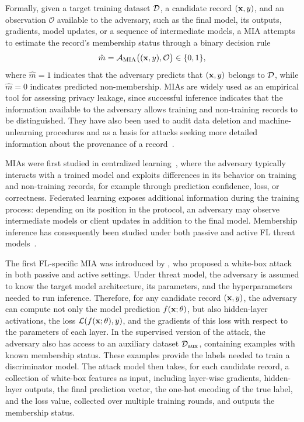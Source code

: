 Formally, given a target training dataset $\mathcal{D}$, a candidate record $({\mathbf{x}},y)$, and an observation $\mathcal{O}$ available to the adversary, such as the final model, its outputs, gradients, model updates, or a sequence of intermediate models, a MIA attempts to estimate the record's membership status through a binary decision rule
\begin{equation}
\hat{m}
=
\mathcal{A}_{\mathrm{MIA}}\big(({\mathbf{x}},y),\mathcal{O}\big)
\in \{0,1\},
\end{equation}
where $\hat{m}=1$ indicates that the adversary predicts that $({\mathbf{x}},y)$ belongs to $\mathcal{D}$, while $\hat{m}=0$ indicates predicted non-membership.
MIAs are widely used as an empirical tool for assessing privacy leakage, since successful inference indicates that the information available to the adversary allows training and non-training records to be distinguished. They have also been used to audit data deletion and machine-unlearning procedures and as a basis for attacks seeking more detailed information about the provenance of a record~\cite{xiao_mia,hu2021sourceinferenceattacksfederated}.

MIAs were first studied in centralized learning~\cite{shokri2017membershipinferenceattacksmachine,yeom2018privacyriskmachinelearning,carlini2022membershipinferenceattacksprinciples}, where the adversary typically interacts with a trained model and exploits differences in its behavior on training and non-training records, for example through prediction confidence, loss, or correctness. Federated learning exposes additional information during the training process: depending on its position in the protocol, an adversary may observe intermediate models or client updates in addition to the final model. Membership inference has consequently been studied under both passive and active FL threat models~\cite{mia_survey_bai}.

The first FL-specific MIA was introduced by , who proposed a white-box attack in both passive and active settings. Under threat model, the adversary is assumed to know the target model architecture, its parameters, and the hyperparameters needed to run inference. Therefore, for any candidate record $({\mathbf{x}},y)$, the adversary can compute not only the model prediction $f({\mathbf{x}};\theta)$, but also hidden-layer activations, the loss $\mathcal{L}(f({\mathbf{x}};\theta),y)$, and the gradients of this loss with respect to the parameters of each layer. In the supervised version of the attack, the adversary also has access to an auxiliary dataset $\mathcal{D}_{\mathrm{aux}}$, containing examples with known membership status. These examples provide the labels needed to train a discriminator model. The attack model then takes, for each candidate record, a collection of white-box features as input, including layer-wise gradients, hidden-layer outputs, the final prediction vector, the one-hot encoding of the true label, and the loss value, collected over multiple training rounds, and outputs the membership status. 


